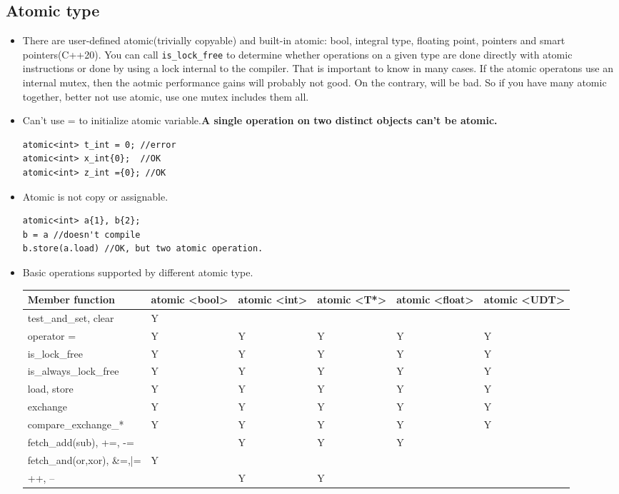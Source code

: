 \documentclass[a4paper,11pt,twoside]{book}
\begin{document}
\subsection{Atomic type}
\begin{itemize}

	\item There are user-defined atomic(trivially copyable) and built-in atomic: bool, integral type, floating point, pointers and smart pointers(C++20).  You can call \texttt{is\_lock\_free} to determine whether operations on a given type are done directly with atomic instructions or done by using a lock internal to the compiler. That is important to know in many cases. If the atomic operatons use an internal mutex, then the aotmic performance gains will probably not good. On the contrary, will be bad. So if you have many atomic together, better not use atomic, use one mutex includes them all.
		
	\item Can't use = to initialize atomic variable.\textbf{A single operation on two distinct objects can't be atomic.}

\begin{lstlisting}[numbers=none]
atomic<int> t_int = 0; //error
atomic<int> x_int{0};  //OK
atomic<int> z_int ={0}; //OK
\end{lstlisting}	

	\item Atomic is not copy or assignable.
\begin{lstlisting}[numbers=none]
atomic<int> a{1}, b{2};
b = a //doesn't compile
b.store(a.load) //OK, but two atomic operation.
\end{lstlisting}
	\item Basic operations supported by different atomic type.	

\begin{tabular}{|p{}|p{}|p{}|p{}|p{}|p{}|}
	\hline
	Member function& atomic <bool>  & atomic <int>  &atomic <T*>  & atomic <float>  & atomic <UDT>  \\
	\hline
	test\_and\_set, clear & Y &  &  &  &  \\
	\hline
	operator = & Y & Y & Y & Y & Y \\
	\hline
	is\_lock\_free & Y & Y & Y & Y & Y  \\
	\hline
	is\_always\_lock\_free & Y & Y & Y & Y & Y  \\
	\hline
	load, store & Y & Y & Y & Y & Y  \\
	\hline
	exchange & Y & Y & Y & Y & Y  \\
	\hline
	compare\_exchange\_* & Y & Y & Y & Y & Y  \\
	\hline
	fetch\_add(sub), +=, -=&  & Y & Y & Y &  \\
	\hline
	fetch\_and(or,xor), \&=,|= & Y &  &  &  &  \\
	\hline
	++, -- &  & Y  & Y &  &  \\
	\hline
\end{tabular}


\end{itemize}
\end{document}
